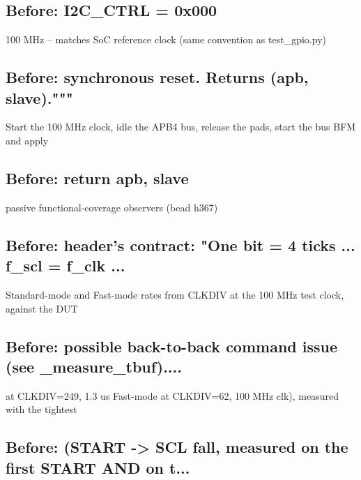 \begin{record}

\subsection*{Before: I2C\_CTRL = 0x000}

\begin{textblock}
100 MHz -- matches SoC reference clock (same convention as test_gpio.py)
\end{textblock}

\subsection*{Before: synchronous reset. Returns (apb, slave)."""}

\begin{textblock}
Start the 100 MHz clock, idle the APB4 bus, release the pads, start the bus BFM and apply
\end{textblock}

\subsection*{Before: return apb, slave}

\begin{textblock}
passive functional-coverage observers (bead h367)
\end{textblock}

\subsection*{Before: header's contract: "One bit = 4 ticks ... f\_scl = f\_clk ...}

\begin{textblock}
Standard-mode and Fast-mode rates from CLKDIV at the 100 MHz test clock, against the DUT
\end{textblock}

\subsection*{Before: possible back-to-back command issue (see \_measure\_tbuf)....}

\begin{textblock}
at CLKDIV=249, 1.3 us Fast-mode at CLKDIV=62, 100 MHz clk), measured with the tightest
\end{textblock}

\subsection*{Before: (START -> SCL fall, measured on the first START AND on t...}


\end{record}
